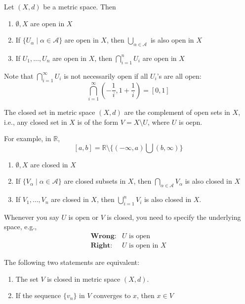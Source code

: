 \begin{proposition}
Let $(X,d)$ be a metric space. Then 
\begin{enumerate}
\item
$\emptyset,X$ are open in $X$
\item
If $\{U_\alpha\mid\alpha\in\mathcal{A}\}$ are open in $X$, then $\bigcup_{\alpha\in\mathcal{A}}$ is also open in $X$
\item
If $U_1,\dots,U_n$ are open in $X$, then $\bigcap_{i=1}^nU_i$ are open in $X$
\end{enumerate}
\end{proposition}

\begin{remark}
Note that $\bigcap_{i=1}^\infty U_i$ is not necessarily open if all $U_i$'s are all open:
\[
\bigcap_{i=1}^\infty
\left(
-\frac{1}{i},1+\frac{1}{i}
\right)
=
[0,1]
\]
\end{remark}

\begin{definition}[Closed]
The closed set in metric space $(X,d)$ are the complement of open sets in $X$, i.e., any closed set in $X$ is of the form $V=X\setminus U$, where $U$ is oepn.
\end{definition}

For example, in $\mathbb{R}$, 
\[
[a,b]=\mathbb{R}\setminus\{(-\infty,a)\bigcup(b,\infty)\}
\]

\begin{proposition}
\begin{enumerate}
\item
$\emptyset,X$ are closed in $X$
\item
If
$\{V_\alpha\mid\alpha\in\mathcal{A}\}$ are closed subsets in $X$, then $\bigcap_{\alpha\in\mathcal{A}}V_\alpha$ is also closed in $X$
\item
If $V_1,\dots,V_n$ are closed in $X$, then $\bigcup_{i=1}^nV_i$ is also closed in $X$.
\end{enumerate}
\end{proposition}

\begin{remark}
Whenever you say $U$ is open or $V$ is closed, you need to specify the underlying space, e.g.,
\begin{align*}
\textbf{Wrong}: &\text{$U$ is open}\\
\textbf{Right}: &\text{$U$ is open in $X$}
\end{align*}
\end{remark}

\begin{proposition}
The following two statements are equivalent:
\begin{enumerate}
\item
The set $V$ is closed in metric space $(X,d)$.
\item
If the sequence $\{v_n\}$ in $V$ converges to $x$, then $x\in V$
\end{enumerate}
\end{proposition}

